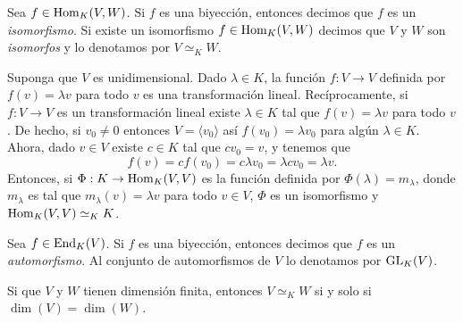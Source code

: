 \begin{defn}
Sea $f\in\operatorname{Hom}_K(V,W)$. Si $f$ es una biyecci\'on, entonces decimos que $f$ es un \emph{isomorfismo}. Si existe un isomorfismo $f\in\operatorname{Hom}_K(V,W)$ decimos que $V$ y $W$ son \emph{isomorfos} y lo denotamos por $V\simeq_K W$.
\end{defn}

\begin{ejem} Suponga que $V$ es unidimensional. Dado $\lambda\in K$, la funci\'on $f:V\rightarrow V$ definida por $f(v)=\lambda v$ para todo $v$ es una transformaci\'on lineal. Rec\'iprocamente, si $f:V\rightarrow V$ es un transformaci\'on lineal existe $\lambda\in K$ tal que $f(v)=\lambda v$ para todo $v$. De hecho, si $v_0\ne 0$ entonces $V=\langle v_0\rangle$ as\'i $f(v_0)=\lambda v_0$ para alg\'un $\lambda\in K$. Ahora, dado $v\in V$ existe $c\in K$ tal que $cv_0=v$, y tenemos que
\[
f(v)=cf(v_0)=c\lambda v_0=\lambda cv_0=\lambda v.
\]
Entonces, si $\Phi: K \rightarrow \operatorname{Hom}_K(V,V)$ es la funci\'on definida por $\Phi(\lambda)=m_\lambda$, donde $m_\lambda$ es tal que $m_\lambda(v)=\lambda v$ para todo $v\in V$, $\Phi$ es un isomorfismo y $\operatorname{Hom}_K(V,V)\simeq_K K$.
\end{ejem}

\begin{defn}
Sea $f\in\operatorname{End}_K(V)$. Si $f$ es una biyecci\'on, entonces decimos que $f$ es un \emph{automorfismo}. Al conjunto de automorfismos de $V$ lo denotamos por $\operatorname{GL}_K(V)$.
\end{defn}

\begin{teo}
Si que $V$ y $W$ tienen dimensi\'on finita, entonces $V\simeq_K W$ si y solo si $\dim(V)=\dim(W)$.
\end{teo}

